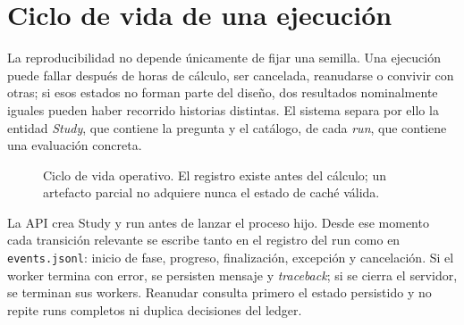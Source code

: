 \section{Ciclo de vida de una ejecución}

La reproducibilidad no depende únicamente de fijar una semilla. Una ejecución puede fallar después
de horas de cálculo, ser cancelada, reanudarse o convivir con otras; si esos estados no forman parte
del diseño, dos resultados nominalmente iguales pueden haber recorrido historias distintas. El
sistema separa por ello la entidad \emph{Study}, que contiene la pregunta y el catálogo, de cada
\emph{run}, que contiene una evaluación concreta.

\begin{figure}[H]
  \centering
  \caption{Ciclo de vida operativo. El registro existe antes del cálculo; un artefacto parcial no
  adquiere nunca el estado de caché válida.}
  \label{fig:ciclo-study}
\end{figure}

La API crea Study y run antes de lanzar el proceso hijo. Desde ese momento cada transición
relevante se escribe tanto en el registro del run como en \texttt{events.jsonl}: inicio de fase,
progreso, finalización, excepción y cancelación. Si el worker termina con error, se persisten mensaje
y \textit{traceback}; si se cierra el servidor, se terminan sus workers. Reanudar consulta primero
el estado persistido y no repite runs completos ni duplica decisiones del ledger.

